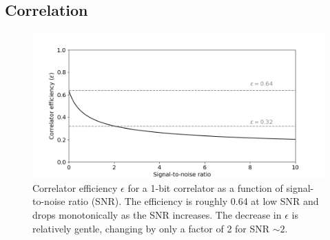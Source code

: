 \documentclass{ws-jai}
\begin{document}
\subsection{Correlation}

\begin{figure}
  \begin{center}
    \includegraphics[width=0.75\linewidth]{Figures/corr_efficiency/corr_efficiency.png}
    \caption{Correlator efficiency $\epsilon$ for a 1-bit correlator
      as a function of signal-to-noise ratio (SNR).  The efficiency is
      roughly 0.64 at low SNR and drops monotonically as the SNR
      increases.  The decrease in $\epsilon$ is relatively gentle,
      changing by only a factor of 2 for SNR $\sim2$.}
    \label{fig:1bit_efficiency}
    \end{center}
\end{figure}
\end{document}
